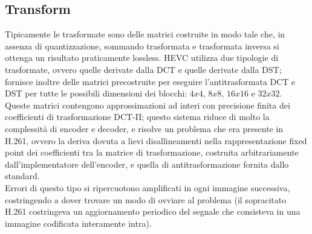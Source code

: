 \subsection{Transform}
Tipicamente le trasformate sono delle matrici costruite in modo tale che, in 
assenza di quantizzazione, sommando trasformata e trasformata inversa si 
ottenga un risultato praticamente lossless.
HEVC utilizza due tipologie di trasformate, ovvero quelle derivate dalla DCT e
quelle derivate dalla DST; fornisce inoltre delle matrici precostruite per 
eseguire l'antitrasformata DCT e DST per tutte le possibili dimensioni dei 
blocchi: $4x4$, $8x8$, $16x16$ e $32x32$.
Queste matrici contengono approssimazioni ad interi con precisione finita dei 
coefficienti di trasformazione DCT-II; questo sistema riduce di molto la 
complessità di encoder e decoder, e risolve un problema che era presente in 
H.261, ovvero la deriva dovuta a lievi disallineamenti nella rappresentazione 
fixed point dei coefficienti tra la matrice di trasformazione, costruita 
arbitrariamente dall'implementatore dell'encoder, e quella di antitrasformazione
fornita dallo standard. \\
Errori di questo tipo si ripercuotono amplificati in ogni immagine successiva, 
costringendo a dover trovare un modo di ovviare al problema (il sopracitato 
H.261 costringeva un aggiornamento periodico del segnale che consisteva in una 
immagine codificata interamente intra).



